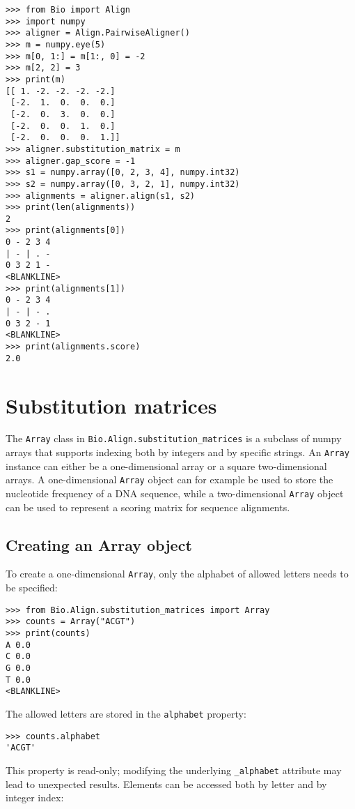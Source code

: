 \begin{verbatim}
>>> from Bio import Align
>>> import numpy
>>> aligner = Align.PairwiseAligner()
>>> m = numpy.eye(5)
>>> m[0, 1:] = m[1:, 0] = -2
>>> m[2, 2] = 3
>>> print(m)
[[ 1. -2. -2. -2. -2.]
 [-2.  1.  0.  0.  0.]
 [-2.  0.  3.  0.  0.]
 [-2.  0.  0.  1.  0.]
 [-2.  0.  0.  0.  1.]]
>>> aligner.substitution_matrix = m
>>> aligner.gap_score = -1
>>> s1 = numpy.array([0, 2, 3, 4], numpy.int32)
>>> s2 = numpy.array([0, 3, 2, 1], numpy.int32)
>>> alignments = aligner.align(s1, s2)
>>> print(len(alignments))
2
>>> print(alignments[0])
0 - 2 3 4
| - | . -
0 3 2 1 -
<BLANKLINE>
>>> print(alignments[1])
0 - 2 3 4
| - | - .
0 3 2 - 1
<BLANKLINE>
>>> print(alignments.score)
2.0
\end{verbatim}

\section{Substitution matrices}
\label{sec:substitution_matrices}

The \verb+Array+ class in \verb+Bio.Align.substitution_matrices+ is a subclass of numpy arrays that supports indexing both by integers and by specific strings. An \verb+Array+ instance can either be a one-dimensional array or a square two-dimensional arrays. A one-dimensional \verb+Array+ object can for example be used to store the nucleotide frequency of a DNA sequence, while a two-dimensional \verb+Array+ object can be used to represent a scoring matrix for sequence alignments.

\subsection{Creating an Array object}

To create a one-dimensional \verb+Array+, only the alphabet of allowed letters needs to be specified:

\begin{verbatim}
>>> from Bio.Align.substitution_matrices import Array
>>> counts = Array("ACGT")
>>> print(counts)
A 0.0
C 0.0
G 0.0
T 0.0
<BLANKLINE>
\end{verbatim}
The allowed letters are stored in the \verb+alphabet+ property:

\begin{verbatim}
>>> counts.alphabet
'ACGT'
\end{verbatim}
This property is read-only; modifying the underlying \verb+_alphabet+ attribute may lead to unexpected results.
Elements can be accessed both by letter and by integer index:

